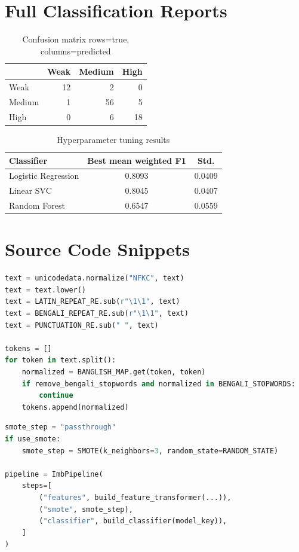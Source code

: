 \documentclass[12pt,a4paper,openany]{book}
\begin{document}
\chapter{Full Classification Reports}
\begin{table}[H]
\centering
\caption{Confusion matrix rows=true, columns=predicted}
\begin{tabular}{lrrr}
\toprule
 & \textbf{Weak} & \textbf{Medium} & \textbf{High}\\
\midrule
Weak & 12 & 2 & 0\\
Medium & 1 & 56 & 5\\
High & 0 & 6 & 18\\
\bottomrule
\end{tabular}
\end{table}

\begin{table}[H]
\centering
\caption{Hyperparameter tuning results}
\small
\begin{tabular}{lcc}
\toprule
\textbf{Classifier} & \textbf{Best mean weighted F1} & \textbf{Std.}\\
\midrule
Logistic Regression & 0.8093 & 0.0409\\
Linear SVC & 0.8045 & 0.0407\\
Random Forest & 0.6547 & 0.0559\\
\bottomrule
\end{tabular}
\end{table}

\chapter{Source Code Snippets}
\begin{lstlisting}[language=Python,caption={Text normalization logic}]
text = unicodedata.normalize("NFKC", text)
text = text.lower()
text = LATIN_REPEAT_RE.sub(r"\1\1", text)
text = BENGALI_REPEAT_RE.sub(r"\1\1", text)
text = PUNCTUATION_RE.sub(" ", text)

tokens = []
for token in text.split():
    normalized = BANGLISH_MAP.get(token, token)
    if remove_bengali_stopwords and normalized in BENGALI_STOPWORDS:
        continue
    tokens.append(normalized)
\end{lstlisting}

\begin{lstlisting}[language=Python,caption={SMOTE placed inside the training pipeline}]
smote_step = "passthrough"
if use_smote:
    smote_step = SMOTE(k_neighbors=3, random_state=RANDOM_STATE)

pipeline = ImbPipeline(
    steps=[
        ("features", build_feature_transformer(...)),
        ("smote", smote_step),
        ("classifier", build_classifier(model_key)),
    ]
)
\end{lstlisting}
\end{document}
